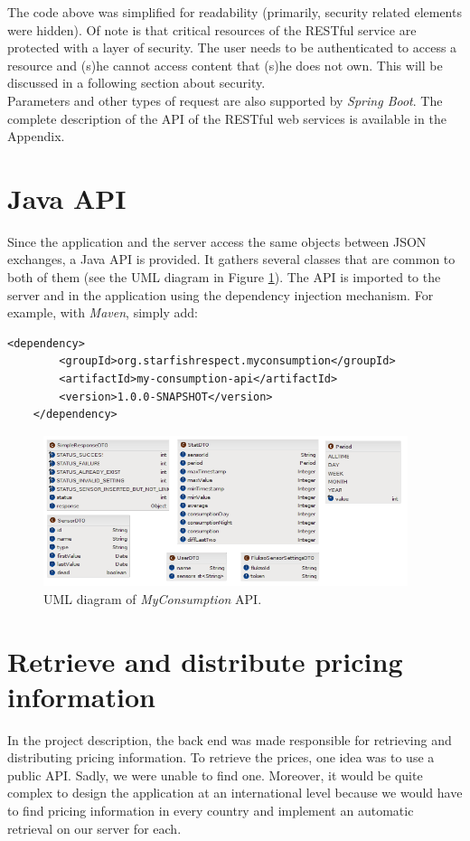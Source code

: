 \documentclass[a4paper, oneside, 11pt]{book}
\begin{document}
The code above was simplified for readability (primarily, security related elements were hidden). Of note is that critical resources of the RESTful service are protected with a layer of security. The user needs to be authenticated to access a resource and (s)he cannot access content that (s)he does not own. This will be discussed in a following section about security.\\

Parameters and other types of request are also supported by \textit{Spring Boot}. The complete description of the API of the RESTful web services is available in the Appendix.

\section{Java API}
Since the application and the server access the same objects between JSON exchanges, a Java API is  provided. It gathers several classes that are common to both of them (see the UML diagram in Figure \ref{fig:dto}). The API is imported to the server and in the application using the dependency injection mechanism. For example, with \textit{Maven}, simply add:
\begin{lstlisting}[breaklines]
	<dependency>
		<groupId>org.starfishrespect.myconsumption</groupId>
		<artifactId>my-consumption-api</artifactId>
		<version>1.0.0-SNAPSHOT</version>
	</dependency>
\end{lstlisting}

\begin{figure}[htbp]
	\centerline{\includegraphics[width=0.95\textwidth]{dto.png}}
	\caption{UML diagram of \textit{MyConsumption} API.}
	\label{fig:dto}
\end{figure}

\section{Retrieve and distribute pricing information}
In the project description, the back end was made responsible for retrieving and distributing pricing information. To retrieve the prices, one idea was to use a public API. Sadly, we were unable to find one. Moreover, it would be quite complex to design the application at an international level because we would have to find pricing information in every country and implement an automatic retrieval on our server for each.\\
\end{document}
